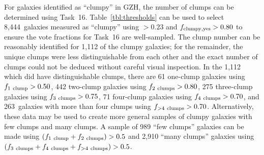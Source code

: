 \documentclass[a4paper,fleqn,usenatbib]{mnras}
\begin{document}
For galaxies identified as ``clumpy'' in GZH, the number of clumps can be
determined using Task~16. Table~\ref{tbl:thresholds} can be used to select
8,444~galaxies measured as ``clumpy'' using \ffeatures$> 0.23$ and $f_{\rm
clumpy,yes}>0.80$ to ensure the vote fractions for Task~16 are well-sampled.
The clump number can be reasonably identified for 1,112 of the clumpy galaxies;
for the remainder, the unique clumps were less distinguishable from each other
and the exact number of clumps could not be deduced without careful visual
inspection. In the 1,112 which did have distinguishable clumps, there are
61 one-clump galaxies using $f_{\rm 1~clump}>0.50$, 442 two-clump galaxies
using $f_{\rm 2~clumps}>0.80$, 275 three-clump galaxies using $f_{\rm
3~clumps}>0.75$, 71 four-clump galaxies using $f_{\rm 4~clumps} > 0.70$,
and 263~galaxies with more than four clumps using $f_{\rm >4~clumps}>0.70$.
Alternatively, these data may be used to create more general samples of
clumpy galaxies with few clumps and many clumps. A sample of 989 ``few
clumps'' galaxies can be made using $(f_{\rm 1~clump} + f_{\rm 2~clumps}) >
0.5$ and 2,910 ``many clumps'' galaxies using $(f_{\rm 3~clumps}+f_{\rm
4~clumps}+f_{\rm >4~clumps})>0.5$.
\end{document}
